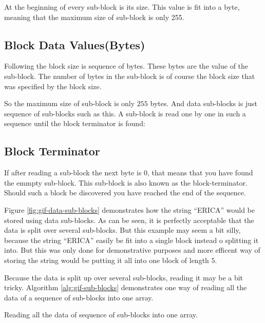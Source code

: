 \begin{refsection}
  At the beginning of every sub-block is its size. This value is fit
  into a byte, meaning that the maximum size of sub-block is only
  255.

  \subsection*{Block Data Values(Bytes)}

  Following the block size is sequence of bytes. These bytes are the
  value of the sub-block. The number of bytes in the sub-block is of
  course the block size that was specified by the block size.

  So the maximum size of sub-block is only $255$ bytes. And data
  sub-blocks is just sequence of sub-blocks such as this. A sub-block
  is read one by one in such a sequence until the block terminator is found:

  \subsection*{Block Terminator}

  If after reading a sub-block the next byte is 0, that means that you
  have found the emmpty sub-block. This sub-block is also known as the
  block-terminator. Should such a block be discovered you have reached
  the end of the sequence.

  Figure \ref{fig:gif-data-sub-blocks} demonstrates how the string
  ``ERICA'' would be stored using data sub-blocks. As can be seen, it
  is perfectly acceptable that the data is split over several
  sub-blocks. But this example may seem a bit silly, because the
  string ``ERICA'' easily be fit into a single block instead o
  splitting it into. But this was only done for demonstrative purposes
  and more efficent way of storing the string would be putting it all
  into one block of length $5$.

  Because the data is split up over several sub-blocks, reading it may
  be a bit tricky. Algorithm \ref{alg:gif-sub-blocks} demonstrates one way of reading all the
  data of a sequence of sub-blocks into one array.

  \begin{algorithm}[H]
    \caption{Reading all the data of sequence of sub-blocks into one array.}
    \label{alg:gif-sub-blocks}
    \begin{algorithmic}[1]
      \Repeat
        \EndRepeatn


\end{algorithmic}
\end{algorithm}
\end{refsection}
